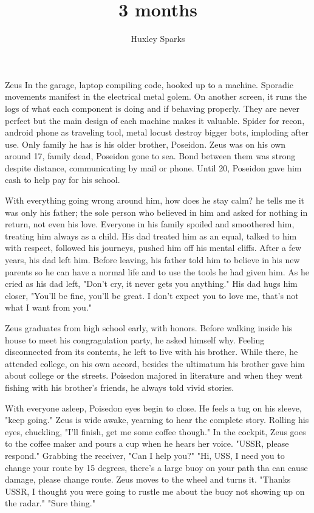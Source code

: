 \title{3 months}
\author{Huxley Sparks}

	Zeus
	In the garage, laptop compiling code, hooked up to a machine. Sporadic movements manifest in the electrical metal golem. On another screen, it runs
	the logs of what each component is doing and if behaving properly. They are never perfect but the main design of each machine makes it
	valuable. Spider for recon, android phone as traveling tool, metal locust destroy bigger bots, imploding after use. Only family he has is his
	older brother, Poseidon. Zeus was on his own around 17, family dead, Poseidon gone to sea. Bond between them was strong despite distance, communicating by
	mail or phone. Until 20, Poseidon gave him cash to help pay for his school.

	    With everything going wrong around him, how does he stay calm? he tells me it was only his father; the sole person who believed in him and asked for nothing
	in return, not even his love. Everyone in his family spoiled and smoothered him, treating him always as a child. His dad treated him as an equal, talked to
	him with respect, followed his journeys, pushed him off his mental cliffs. After a few years, his dad left him. Before leaving, his father told him to believe
	in his new parents so he can have a normal life and to use the tools he had given him. As he cried as his dad left, "Don't cry, it never gets you anything."
	His dad hugs him closer, "You'll be fine, you'll be great. I don't expect you to love me, that's not what I want from you."
	
		Zeus graduates from high school early, with honors. Before walking inside his house to meet his congragulation party, he asked himself why. Feeling  
	disconnected from its contents, he left to live with his brother. While there, he attended college, on his own accord, besides the ultimatum his brother
	gave him about college or the streets. Poisedon majored in literature and when they went fishing with his brother's friends, he always told vivid stories.

		With everyone asleep, Poisedon eyes begin to close. He feels a tug on his sleeve, "keep going." Zeus is wide awake, yearning to hear the complete 
	story. Rolling his eyes, chuckling, "I'll finish, get me some coffee though." In the cockpit, Zeus goes to the coffee maker and pours a cup when he hears her
	voice. "USSR, please respond." Grabbing the receiver, "Can I help you?" "Hi, USS, I need you to change your route by 15 degrees, there's a large buoy on
	your path tha can cause damage, please change route. Zeus moves to the wheel and turns it. "Thanks USSR, I thought you were going to rustle me about the
	buoy not showing up on the radar." "Sure thing."

